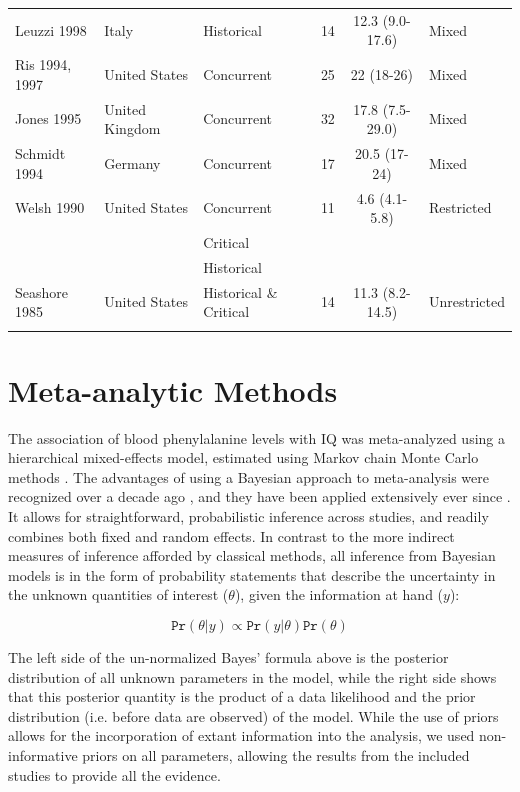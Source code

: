 \documentclass{svjour3}                     %
\begin{document}
\begin{table}
\begin{tabular}{lllccl}
    Leuzzi 1998 & Italy & Historical & 14 & 12.3 (9.0-17.6) & Mixed\\
    Ris 1994, 1997 & United States & Concurrent & 25 & 22 (18-26) & Mixed\\
    Jones 1995 & United Kingdom & Concurrent & 32 & 17.8 (7.5-29.0) & Mixed\\
    Schmidt 1994 & Germany & Concurrent & 17 & 20.5 (17-24) & Mixed\\
    Welsh 1990 & United States & Concurrent & 11 & 4.6 (4.1-5.8) & Restricted\\
    & & Critical &  &  & \\
    & & Historical &  &  & \\
    Seashore 1985 & United States & Historical \& Critical & 14 & 11.3 (8.2-14.5) & Unrestricted\\
    \noalign{\smallskip}\hline
    \end{tabular}

\end{table}




\section{Meta-analytic Methods} %
\label{sec:Meta-analytic Methods}

The association of blood phenylalanine levels with IQ was meta-analyzed using a hierarchical mixed-effects model, estimated using Markov chain Monte Carlo methods \citep{Gelman:2003vk}. The advantages of using a Bayesian approach to meta-analysis were recognized over a decade ago \citep{Smith:1995vk}, and they have been applied extensively ever since \citep{Tweedie:1996vy, Sutton:2001tq, Brophy:2001vu, Brophy:2003vv, Babapulle:2004tp, Kaizar:2006io, Afilalo:2008ir}. It allows for straightforward, probabilistic inference across studies, and readily combines both fixed and random effects. In contrast to the more indirect measures of inference afforded by classical methods, all inference from Bayesian models is in the form of probability statements that describe the uncertainty in the unknown quantities of interest ($\theta$), given the information at hand ($y$):

\[ \texttt{Pr}(\theta | y) \propto \texttt{Pr}(y | \theta) \texttt{Pr}(\theta) \]

The left side of the un-normalized Bayes' formula above is the posterior distribution of all unknown parameters in the model, while the right side shows that this posterior quantity is the product of a data likelihood and the prior distribution (i.e. before data are observed) of the model. While the use of priors allows for the incorporation of extant information into the analysis, we used non-informative priors on all parameters, allowing the results from the included studies to provide all the evidence.
\end{document}
